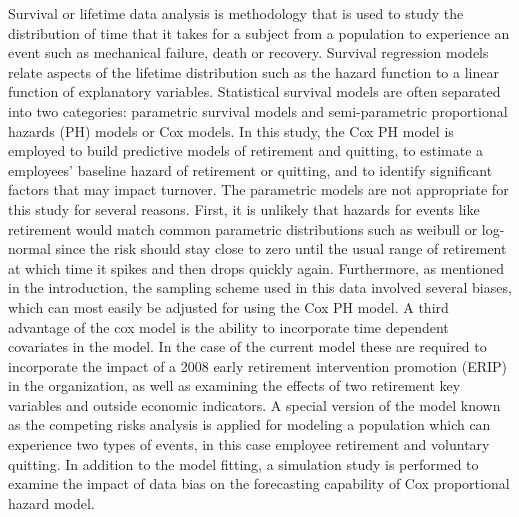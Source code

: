 \documentclass[12pt,letterpaper]{article}
\begin{document}
 Survival or lifetime data analysis is methodology that is used to study the distribution of time that it takes for a subject from a population to experience an event such as mechanical failure, death or recovery. Survival regression models relate aspects of the lifetime distribution such as the hazard function to a linear function of explanatory variables.  Statistical survival models are often separated into two categories: parametric survival models and semi-parametric proportional hazards (PH) models or Cox models. In this study, the Cox PH model is employed to build predictive models of retirement and quitting, to estimate a employees' baseline hazard of retirement or quitting, and to identify significant factors that may impact turnover. The parametric models are not appropriate for this study for several reasons. First, it is unlikely that hazards for events like retirement would match common parametric distributions such as weibull or log-normal since the risk should stay close to zero until the usual range of retirement at which time it spikes and then drops quickly again.  Furthermore, as mentioned in the introduction, the sampling scheme used in this data involved several biases, which can most easily be adjusted for using the Cox PH model. A third advantage of the cox model is the ability to incorporate time dependent covariates in the model. In the case of the current model these are required to incorporate the impact of a 2008 early retirement intervention promotion (ERIP) in the organization, as well as examining the effects of two retirement key variables and outside economic indicators. A special version of the model known as the competing risks analysis is applied for modeling a population which can experience two types of events, in this case employee retirement and voluntary quitting. In addition to the model fitting, a simulation study is performed to examine the impact of data bias on the forecasting capability of Cox proportional hazard model.
\end{document}
